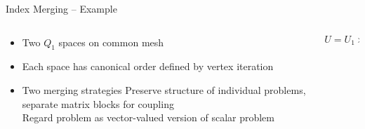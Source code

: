 \documentclass[aspectratio=169,11pt]{beamer}
\theoremstyle{definition}
\begin{document}
\begin{frame}{Index Merging -- Example}
  \begin{columns}
    \begin{column}{0.5\textwidth}
      \begin{itemize}
      \item Two $Q_1$ spaces on common mesh
      \item Each space has canonical order defined by vertex iteration
      \item Two merging strategies
         Preserve structure of individual problems, separate matrix blocks for coupling\\
         Regard problem as vector-valued version of scalar problem
      \end{itemize}
% 
% 

    \end{column}
    \begin{column}{0.5\textwidth}
{\Large
\begin{equation*}
U = U_1 \times U_2
\end{equation*}}\vspace*{.5em}
\resizebox{\textwidth}{!}{

}

    \end{column}
  \end{columns}
\end{frame}
\end{document}
